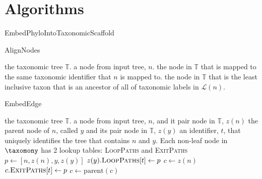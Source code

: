 \documentclass[11pt]{article}
\newcommand{\leafLabels}[1]{\ensuremath{\mathcal{L}(#1)}}
\newcommand{\parent}[1]{\ensuremath{\mbox{parent}(#1)}}
\newcommand{\nodes}[1]{\ensuremath{\mbox{nodes}(#1)}}
\newcommand{\treeRoot}[1]{\ensuremath{\mbox{root}(#1)}}
\newcommand{\taxonomy}[0]{\ensuremath{\mathbb{T}}\xspace}
\begin{document}
\newpage
\section{Algorithms}
\begin{algorithm} \caption{EmbedPhyloIntoTaxonomicScaffold}\label{embedTree} \begin{algorithmic}
\REQUIRE the taxonomic tree $\taxonomy$.
\REQUIRE an input tree, $T$ with a unique identifier $\mbox{id}(T)$
\FOR{each node $n_i$ in $\nodes{T}$}
    \STATE{$z(n_i) \leftarrow \mbox{AlignNodes}(\taxonomy, n_i)$
\ENDFOR
\FOR{each node $n_i$ in $\nodes{T}$}
    \IF{$n_i \neq \treeRoot{T}$}
    \STATE $y_i \leftarrow \parent{n_i}$
    \STATE$\mbox{EmbedEdge}(\taxonomy, {y_i}, z(y_i), n_i, z(n_i), \mbox{id}(T))$
    \ENDIF
\ENDFOR
\end{algorithmic}\end{algorithm}
\begin{algorithm} \caption{AlignNodes}\label{alignNodes} \begin{algorithmic}
\REQUIRE the taxonomic tree $\taxonomy$.
\REQUIRE a node from input tree, $n$.
    \RETURN the node in $\taxonomy$ that is mapped to the same taxonomic identifier that $n$ is mapped to.
\ELSE
    \RETURN the node in $\taxonomy$ that is the least inclusive taxon that is an ancestor of all of 
    taxonomic labels in $\leafLabels{n}$.
\ENDIF
\end{algorithmic}\end{algorithm}
\begin{algorithm} \caption{EmbedEdge}\label{embedEdge} \begin{algorithmic}
\REQUIRE the taxonomic tree $\taxonomy$.
\REQUIRE a node from input tree, $n$, and it pair node in $\taxonomy$, $z(n)$
\REQUIRE the parent node of $n$, called $y$ and its pair node in $\taxonomy$, $z(y)$
\REQUIRE an identifier, $t$, that uniquely identifies the tree that contains $n$ and $y$.
\REQUIRE Each non-leaf node in $\taxomony$ has 2 lookup tables: \textsc{LoopPaths} and \textsc{ExitPaths}
\STATE $p \leftarrow \left[n, z(n), y, z(y)\right]$ 
    \STATE $z(y).\textsc{LoopPaths}[t] \leftarrow p$
\ELSE
    \STATE $c\leftarrow z(n)$
        \STATE $c.\textsc{ExitPaths}[t] \leftarrow p$
        \STATE $c \leftarrow \parent{c}$
    \ENDWHILE
\ENDIF
\end{algorithmic}
\end{algorithm}
\end{document}
